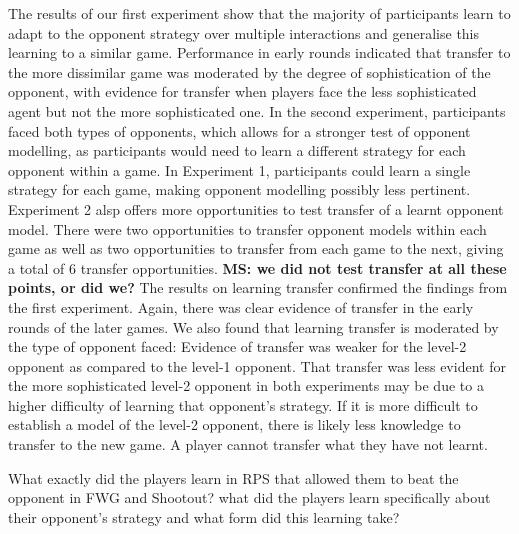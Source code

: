 \documentclass[
  english,
  man,floatsintext]{apa6}
\begin{document}
The results of our first experiment show that the majority of participants learn to adapt to the opponent strategy over multiple interactions and generalise this learning to a similar game. Performance in early rounds indicated that transfer to the more dissimilar game was moderated by the degree of sophistication of the opponent, with evidence for transfer when players face the less sophisticated agent but not the more sophisticated one. In the second experiment, participants faced both types of opponents, which allows for a stronger test of opponent modelling, as participants would need to learn a different strategy for each opponent within a game. In Experiment 1, participants could learn a single strategy for each game, making opponent modelling possibly less pertinent. Experiment 2 alsp offers more opportunities to test transfer of a learnt opponent model. There were two opportunities to transfer opponent models within each game as well as two opportunities to transfer from each game to the next, giving a total of 6 transfer opportunities. \textbf{MS: we did not test transfer at all these points, or did we?} The results on learning transfer confirmed the findings from the first experiment. Again, there was clear evidence of transfer in the early rounds of the later games. We also found that learning transfer is moderated by the type of opponent faced: Evidence of transfer was weaker for the level-2 opponent as compared to the level-1 opponent. That transfer was less evident for the more sophisticated level-2 opponent in both experiments may be due to a higher difficulty of learning that opponent's strategy. If it is more difficult to establish a model of the level-2 opponent, there is likely less knowledge to transfer to the new game. A player cannot transfer what they have not learnt.

What exactly did the players learn in RPS that allowed them to beat the opponent in FWG and Shootout? what did the players learn specifically about their opponent's strategy and what form did this learning take?
\end{document}
